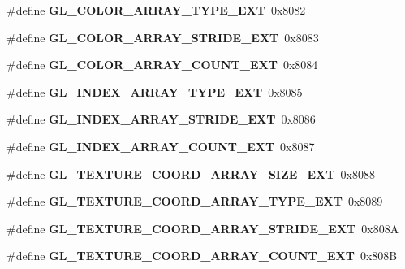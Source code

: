\begin{DoxyCompactItemize}
\item 
\#define {\bfseries G\+L\+\_\+\+C\+O\+L\+O\+R\+\_\+\+A\+R\+R\+A\+Y\+\_\+\+T\+Y\+P\+E\+\_\+\+E\+X\+T}~0x8082\label{_s_d_l__opengl_8h_a40824c6b3c6c005b5eadce466ca89e6e}

\item 
\#define {\bfseries G\+L\+\_\+\+C\+O\+L\+O\+R\+\_\+\+A\+R\+R\+A\+Y\+\_\+\+S\+T\+R\+I\+D\+E\+\_\+\+E\+X\+T}~0x8083\label{_s_d_l__opengl_8h_ac77c238639594407fc52b54816ee5d33}

\item 
\#define {\bfseries G\+L\+\_\+\+C\+O\+L\+O\+R\+\_\+\+A\+R\+R\+A\+Y\+\_\+\+C\+O\+U\+N\+T\+\_\+\+E\+X\+T}~0x8084\label{_s_d_l__opengl_8h_acd66887ddd5fef4fe5170799bcc77189}

\item 
\#define {\bfseries G\+L\+\_\+\+I\+N\+D\+E\+X\+\_\+\+A\+R\+R\+A\+Y\+\_\+\+T\+Y\+P\+E\+\_\+\+E\+X\+T}~0x8085\label{_s_d_l__opengl_8h_a44a040d77b567d4ec32f839a14335e9f}

\item 
\#define {\bfseries G\+L\+\_\+\+I\+N\+D\+E\+X\+\_\+\+A\+R\+R\+A\+Y\+\_\+\+S\+T\+R\+I\+D\+E\+\_\+\+E\+X\+T}~0x8086\label{_s_d_l__opengl_8h_acbbf258b8d9d655b9d2e1573804567bb}

\item 
\#define {\bfseries G\+L\+\_\+\+I\+N\+D\+E\+X\+\_\+\+A\+R\+R\+A\+Y\+\_\+\+C\+O\+U\+N\+T\+\_\+\+E\+X\+T}~0x8087\label{_s_d_l__opengl_8h_a1b49eb4716b448b0f3ea7fcfb1ac9d8e}

\item 
\#define {\bfseries G\+L\+\_\+\+T\+E\+X\+T\+U\+R\+E\+\_\+\+C\+O\+O\+R\+D\+\_\+\+A\+R\+R\+A\+Y\+\_\+\+S\+I\+Z\+E\+\_\+\+E\+X\+T}~0x8088\label{_s_d_l__opengl_8h_a64adb8291e37a801fa3a49a11c9ac14c}

\item 
\#define {\bfseries G\+L\+\_\+\+T\+E\+X\+T\+U\+R\+E\+\_\+\+C\+O\+O\+R\+D\+\_\+\+A\+R\+R\+A\+Y\+\_\+\+T\+Y\+P\+E\+\_\+\+E\+X\+T}~0x8089\label{_s_d_l__opengl_8h_acf558f75c3579b0cb8f0dec4d9af90dd}

\item 
\#define {\bfseries G\+L\+\_\+\+T\+E\+X\+T\+U\+R\+E\+\_\+\+C\+O\+O\+R\+D\+\_\+\+A\+R\+R\+A\+Y\+\_\+\+S\+T\+R\+I\+D\+E\+\_\+\+E\+X\+T}~0x808\+A\label{_s_d_l__opengl_8h_a3010197af61d4336855ea9bad35dd953}

\item 
\#define {\bfseries G\+L\+\_\+\+T\+E\+X\+T\+U\+R\+E\+\_\+\+C\+O\+O\+R\+D\+\_\+\+A\+R\+R\+A\+Y\+\_\+\+C\+O\+U\+N\+T\+\_\+\+E\+X\+T}~0x808\+B\label{_s_d_l__opengl_8h_a8904b2150293bc2d7932054da6323a75}


\end{DoxyCompactItemize}
